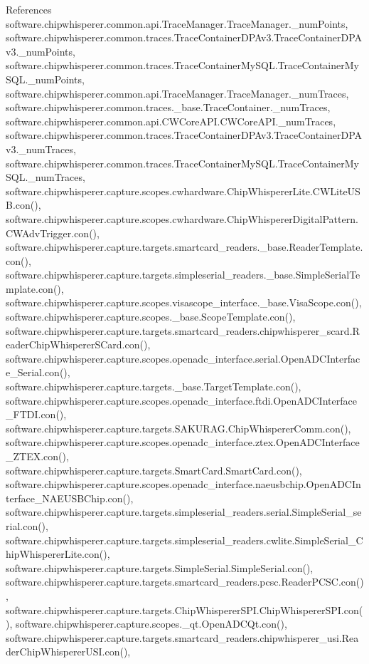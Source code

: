 References software.\+chipwhisperer.\+common.\+api.\+Trace\+Manager.\+Trace\+Manager.\+\_\+num\+Points, software.\+chipwhisperer.\+common.\+traces.\+Trace\+Container\+D\+P\+Av3.\+Trace\+Container\+D\+P\+Av3.\+\_\+num\+Points, software.\+chipwhisperer.\+common.\+traces.\+Trace\+Container\+My\+S\+Q\+L.\+Trace\+Container\+My\+S\+Q\+L.\+\_\+num\+Points, software.\+chipwhisperer.\+common.\+api.\+Trace\+Manager.\+Trace\+Manager.\+\_\+num\+Traces, software.\+chipwhisperer.\+common.\+traces.\+\_\+base.\+Trace\+Container.\+\_\+num\+Traces, software.\+chipwhisperer.\+common.\+api.\+C\+W\+Core\+A\+P\+I.\+C\+W\+Core\+A\+P\+I.\+\_\+num\+Traces, software.\+chipwhisperer.\+common.\+traces.\+Trace\+Container\+D\+P\+Av3.\+Trace\+Container\+D\+P\+Av3.\+\_\+num\+Traces, software.\+chipwhisperer.\+common.\+traces.\+Trace\+Container\+My\+S\+Q\+L.\+Trace\+Container\+My\+S\+Q\+L.\+\_\+num\+Traces, software.\+chipwhisperer.\+capture.\+scopes.\+cwhardware.\+Chip\+Whisperer\+Lite.\+C\+W\+Lite\+U\+S\+B.\+con(), software.\+chipwhisperer.\+capture.\+scopes.\+cwhardware.\+Chip\+Whisperer\+Digital\+Pattern.\+C\+W\+Adv\+Trigger.\+con(), software.\+chipwhisperer.\+capture.\+targets.\+smartcard\+\_\+readers.\+\_\+base.\+Reader\+Template.\+con(), software.\+chipwhisperer.\+capture.\+targets.\+simpleserial\+\_\+readers.\+\_\+base.\+Simple\+Serial\+Template.\+con(), software.\+chipwhisperer.\+capture.\+scopes.\+visascope\+\_\+interface.\+\_\+base.\+Visa\+Scope.\+con(), software.\+chipwhisperer.\+capture.\+scopes.\+\_\+base.\+Scope\+Template.\+con(), software.\+chipwhisperer.\+capture.\+targets.\+smartcard\+\_\+readers.\+chipwhisperer\+\_\+scard.\+Reader\+Chip\+Whisperer\+S\+Card.\+con(), software.\+chipwhisperer.\+capture.\+scopes.\+openadc\+\_\+interface.\+serial.\+Open\+A\+D\+C\+Interface\+\_\+\+Serial.\+con(), software.\+chipwhisperer.\+capture.\+targets.\+\_\+base.\+Target\+Template.\+con(), software.\+chipwhisperer.\+capture.\+scopes.\+openadc\+\_\+interface.\+ftdi.\+Open\+A\+D\+C\+Interface\+\_\+\+F\+T\+D\+I.\+con(), software.\+chipwhisperer.\+capture.\+targets.\+S\+A\+K\+U\+R\+A\+G.\+Chip\+Whisperer\+Comm.\+con(), software.\+chipwhisperer.\+capture.\+scopes.\+openadc\+\_\+interface.\+ztex.\+Open\+A\+D\+C\+Interface\+\_\+\+Z\+T\+E\+X.\+con(), software.\+chipwhisperer.\+capture.\+targets.\+Smart\+Card.\+Smart\+Card.\+con(), software.\+chipwhisperer.\+capture.\+scopes.\+openadc\+\_\+interface.\+naeusbchip.\+Open\+A\+D\+C\+Interface\+\_\+\+N\+A\+E\+U\+S\+B\+Chip.\+con(), software.\+chipwhisperer.\+capture.\+targets.\+simpleserial\+\_\+readers.\+serial.\+Simple\+Serial\+\_\+serial.\+con(), software.\+chipwhisperer.\+capture.\+targets.\+simpleserial\+\_\+readers.\+cwlite.\+Simple\+Serial\+\_\+\+Chip\+Whisperer\+Lite.\+con(), software.\+chipwhisperer.\+capture.\+targets.\+Simple\+Serial.\+Simple\+Serial.\+con(), software.\+chipwhisperer.\+capture.\+targets.\+smartcard\+\_\+readers.\+pcsc.\+Reader\+P\+C\+S\+C.\+con(), software.\+chipwhisperer.\+capture.\+targets.\+Chip\+Whisperer\+S\+P\+I.\+Chip\+Whisperer\+S\+P\+I.\+con(), software.\+chipwhisperer.\+capture.\+scopes.\+\_\+qt.\+Open\+A\+D\+C\+Qt.\+con(), software.\+chipwhisperer.\+capture.\+targets.\+smartcard\+\_\+readers.\+chipwhisperer\+\_\+usi.\+Reader\+Chip\+Whisperer\+U\+S\+I.\+con(), 